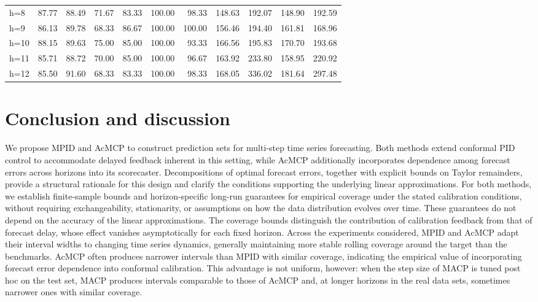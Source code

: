 \documentclass[
  american,
  12pt]{article}
\theoremstyle{plain}
\theoremstyle{plain}
\theoremstyle{remark}
\begin{document}
\begin{table}
{{\begin{tabular}{lrrrrrrrrrr}
h=8  & 87.77 & 88.49 & 71.67 & 83.33 & 100.00 & 98.33 & 148.63 & 192.07 & 148.90 & 192.59 \\
h=9  & 86.13 & 89.78 & 68.33 & 86.67 & 100.00 & 100.00 & 156.46 & 194.40 & 161.81 & 168.96 \\
h=10 & 88.15 & 89.63 & 75.00 & 85.00 & 100.00 & 93.33 & 166.56 & 195.83 & 170.70 & 193.68 \\
h=11 & 85.71 & 88.72 & 70.00 & 85.00 & 100.00 & 96.67 & 163.92 & 233.80 & 158.95 & 220.92 \\
h=12 & 85.50 & 91.60 & 68.33 & 83.33 & 100.00 & 98.33 & 168.05 & 336.02 & 181.64 & 297.48 \\
\bottomrule
\end{tabular}}

}

\end{table}%

\section{Conclusion and discussion}\label{conclusion-and-discussion}

We propose MPID and AcMCP to construct prediction sets for multi-step
time series forecasting. Both methods extend conformal PID control
\citep{angelopoulos2024} to accommodate delayed feedback inherent in
this setting, while AcMCP additionally incorporates dependence among
forecast errors across horizons into its scorecaster. Decompositions of
optimal forecast errors, together with explicit bounds on Taylor
remainders, provide a structural rationale for this design and clarify
the conditions supporting the underlying linear approximations. For both
methods, we establish finite-sample bounds and horizon-specific long-run
guarantees for empirical coverage under the stated calibration
conditions, without requiring exchangeability, stationarity, or
assumptions on how the data distribution evolves over time. These
guarantees do not depend on the accuracy of the linear approximations.
The coverage bounds distinguish the contribution of calibration feedback
from that of forecast delay, whose effect vanishes asymptotically for
each fixed horizon. Across the experiments considered, MPID and AcMCP
adapt their interval widths to changing time series dynamics, generally
maintaining more stable rolling coverage around the target than the
benchmarks. AcMCP often produces narrower intervals than MPID with
similar coverage, indicating the empirical value of incorporating
forecast error dependence into conformal calibration. This advantage is
not uniform, however: when the step size of MACP is tuned post hoc on
the test set, MACP produces intervals comparable to those of AcMCP and,
at longer horizons in the real data sets, sometimes narrower ones with
similar coverage.
\end{document}
